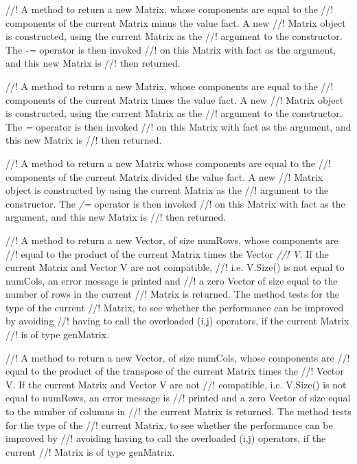 //! A method to return a new Matrix, whose components are equal to the
//! components of the current Matrix minus the value \p fact. A new
//! Matrix object is constructed, using the current Matrix as the
//! argument to the constructor. The {\em -=} operator is then invoked 
//! on this Matrix with \p fact as the argument, and this new Matrix is
//! then returned. 


//! A method to return a new Matrix, whose components are equal to the
//! components of the current Matrix times the value \p fact. A new
//! Matrix object is constructed, using the current Matrix as the
//! argument to the constructor. The {\em *=} operator is then invoked 
//! on this Matrix with \p fact as the argument, and this new Matrix is
//! then returned. 

//! A method to return a new Matrix whose components are equal to the
//! components of the current Matrix divided the value \p fact. A new
//! Matrix object is constructed by using the current Matrix as the
//! argument to the constructor. The {\em /=} operator is then invoked 
//! on this Matrix with \p fact as the argument, and this new Matrix is
//! then returned. 

//! A method to return a new Vector, of size numRows, whose components are
//! equal to the product of the current Matrix times the Vector {\em
//! V}. If the current Matrix and Vector \p V are not compatible,
//! i.e. V.Size() is not equal to numCols, an error message is printed and 
//! a zero Vector of size equal to the number of rows in the current
//! Matrix is returned. The method tests for the type of the current
//! Matrix, to see whether the performance can be improved by avoiding
//! having to call the overloaded (i,j) operators, if the current Matrix
//! is of type genMatrix. 

//! A method to return a new Vector, of size numCols, whose components are
//! equal to the product of the transpose of the current Matrix times the
//! Vector \p V. If the current Matrix and Vector \p V are not
//! compatible, i.e. V.Size() is not equal to numRows, an error message is
//! printed and a zero Vector of size equal to the number of columns in
//! the current Matrix is returned. The method tests for the type of the
//! current Matrix, to see whether the performance can be improved by
//! avoiding having to call the overloaded (i,j) operators, if the current
//! Matrix is of type genMatrix. 

